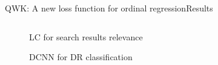 \documentclass{beamer}
\begin{document}
\begin{frame}{QWK: A new loss function for ordinal regression}{Results}	
	\begin{columns}
		\begin{column}{0.5\textwidth}
			\begin{figure}[p]
				\caption{LC for search results relevance}
			\end{figure}
			\begin{figure}[p]
				\caption{DCNN for DR classification}
			\end{figure}			
		\end{column}
		\begin{column}{0.5\textwidth}  %

\end{column}
\end{columns}
\end{frame}
\end{document}
